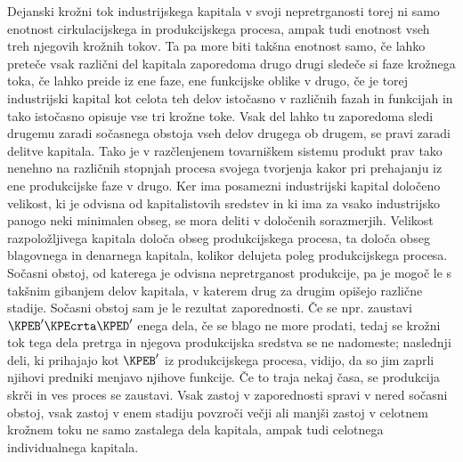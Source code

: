 \documentclass[kapital_02.tex]{subfiles}
\begin{document}
Dejanski krožni tok industrijskega kapitala v svoji nepretrganosti torej ni samo enotnost cirkulacijskega in produkcijskega procesa, ampak tudi enotnost vseh treh njegovih krožnih tokov. Ta pa more biti takšna enotnost samo, če lahko preteče vsak različni del kapitala zaporedoma drugo drugi sledeče si faze krožnega toka, če lahko preide iz ene faze, ene funkcijske oblike v drugo, če je torej industrijski kapital kot celota teh delov istočasno v različnih fazah in funkcijah in tako istočasno opisuje vse tri krožne toke. Vsak del lahko tu zaporedoma sledi drugemu zaradi sočasnega obstoja vseh delov drugega ob drugem, se pravi zaradi delitve kapitala. Tako je v razčlenjenem tovarniškem sistemu produkt prav tako nenehno na različnih stopnjah procesa svojega tvorjenja kakor pri prehajanju iz ene produkcijske faze v drugo. Ker ima posamezni industrijski kapital določeno velikost, ki je odvisna od kapitalistovih sredstev in ki ima za vsako industrijsko panogo neki minimalen obseg, se mora deliti v določenih sorazmerjih. Velikost razpoložljivega kapitala določa obseg produkcijskega procesa, ta določa obseg blagovnega in denarnega kapitala, kolikor delujeta poleg produkcijskega procesa. Sočasni obstoj, od katerega je odvisna nepretrganost produkcije, pa je mogoč le s takšnim gibanjem delov kapitala, v katerem drug za drugim opišejo različne stadije. Sočasni \KPEstran obstoj sam je le rezultat zaporednosti. Če se npr. zaustavi \( \KPEB' \KPEcrta \KPED' \) enega dela, če se blago ne more prodati, tedaj se krožni tok tega dela pretrga in njegova produkcijska sredstva se ne nadomeste; naslednji deli, ki prihajajo kot \( \KPEB' \) iz produkcijskega procesa, vidijo, da so jim zaprli njihovi predniki menjavo njihove funkcije. Če to traja nekaj časa, se produkcija skrči in ves proces se zaustavi. Vsak zastoj v zaporednosti spravi v nered sočasni obstoj, vsak zastoj v enem stadiju povzroči večji ali manjši zastoj v celotnem krožnem toku ne samo zastalega dela kapitala, ampak tudi celotnega individualnega kapitala.
\end{document}
